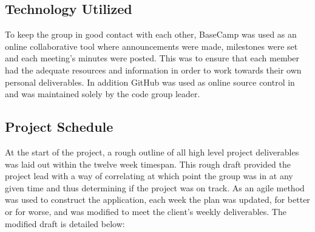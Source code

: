 \documentclass[a4paper,11pt]{article}
\begin{document}
\subsection{Technology Utilized}
To keep the group in good contact with each other, BaseCamp was used as an online collaborative tool where announcements were made, milestones were set and each meeting's minutes were posted. This was to ensure that each member had the adequate resources and information in order to work towards their own personal deliverables. In addition GitHub was used as online source control in and was maintained solely by the code group leader.

\subsection{Project Schedule}
At the start of the project, a rough outline of all high level project deliverables was laid out within the twelve week timespan. This rough draft provided the project lead with a way of correlating at which point the group was in at any given time and thus determining if the project was on track. As an agile method was used to construct the application, each week the plan was updated, for better or for worse, and was modified to meet the client's weekly deliverables. The modified draft is detailed below:
\end{document}

